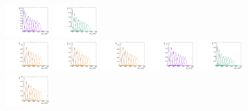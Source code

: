 \begin{figure}[htbp]
  \includegraphics[width=0.18\textwidth]{fig/analysisAppendix/templateSignalVsMX_fromDC_WprToWZ_MVV_mu_LP_bb_HDy.pdf}
  \includegraphics[width=0.18\textwidth]{fig/analysisAppendix/templateSignalVsMX_fromDC_WprToWH_MVV_mu_LP_bb_HDy.pdf}\\
  \includegraphics[width=0.18\textwidth]{fig/analysisAppendix/templateSignalVsMX_fromDC_GbuToWW_MVV_mu_HP_nobb_HDy.pdf}
  \includegraphics[width=0.18\textwidth]{fig/analysisAppendix/templateSignalVsMX_fromDC_RadToWW_MVV_mu_HP_nobb_HDy.pdf}
  \includegraphics[width=0.18\textwidth]{fig/analysisAppendix/templateSignalVsMX_fromDC_ZprToWW_MVV_mu_HP_nobb_HDy.pdf}
  \includegraphics[width=0.18\textwidth]{fig/analysisAppendix/templateSignalVsMX_fromDC_WprToWZ_MVV_mu_HP_nobb_HDy.pdf}
  \includegraphics[width=0.18\textwidth]{fig/analysisAppendix/templateSignalVsMX_fromDC_WprToWH_MVV_mu_HP_nobb_HDy.pdf}\\
  \includegraphics[width=0.18\textwidth]{fig/analysisAppendix/templateSignalVsMX_fromDC_GbuToWW_MVV_mu_LP_nobb_HDy.pdf}

\end{figure}
